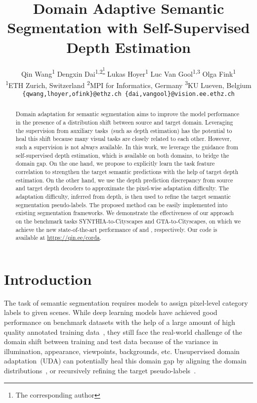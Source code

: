 \documentclass[10pt,twocolumn,letterpaper]{article}
\begin{document}
\title{Domain Adaptive Semantic Segmentation with Self-Supervised Depth Estimation}

\author{Qin Wang\textsuperscript{1} \quad Dengxin Dai\textsuperscript{1,2\thanks{The corresponding author}} \quad Lukas Hoyer\textsuperscript{1} \quad Luc Van Gool\textsuperscript{1,3} \quad Olga Fink\textsuperscript{1}\\
\textsuperscript{1}ETH Zurich, Switzerland \quad \textsuperscript{2}MPI for Informatics, Germany \quad \textsuperscript{3}KU Lueven, Belgium  \\
{\tt\small \{qwang,lhoyer,ofink\}@ethz.ch \{dai,vangool\}@vision.ee.ethz.ch}

}

\maketitle



\begin{abstract}
Domain adaptation for semantic segmentation aims to improve the model performance in the presence of a distribution shift between source and target domain. Leveraging the supervision from auxiliary tasks~(such as depth estimation) has the potential to heal this shift because many visual tasks are closely related to each other. However, such a supervision is not always available. In this work, we leverage the guidance from self-supervised depth estimation, which is available on both domains, to bridge the domain gap. On the one hand, we propose to explicitly learn the task feature correlation to strengthen the target semantic predictions with the help of target depth estimation. On the other hand, we use the depth prediction discrepancy from source and target depth decoders to approximate the pixel-wise adaptation difficulty. The adaptation difficulty, inferred from depth, is then used to refine the target semantic segmentation pseudo-labels. The proposed method can be easily implemented into existing segmentation frameworks. We demonstrate the effectiveness of our approach on the benchmark tasks SYNTHIA-to-Cityscapes and GTA-to-Cityscapes, on which we achieve the new state-of-the-art performance of  and , respectively. Our code is available at \url{https://qin.ee/corda}.


\end{abstract}

\section{Introduction}
The task of semantic segmentation requires models to assign pixel-level category labels to given scenes. While deep learning models have achieved good performance on benchmark datasets with the help of a large amount of high quality annotated training data~\cite{chen2017deeplab, yuan2019object}, they still face the real-world challenge of the domain shift between training and test data because of the variance in illumination, appearance, viewpoints, backgrounds, etc. Unsupervised domain adaptation~(UDA) can potentially heal this domain gap by aligning the domain distributions~\cite{vu2018advent}, or recursively refining the target pseudo-labels~\cite{zou2018domain}.
\end{document}
